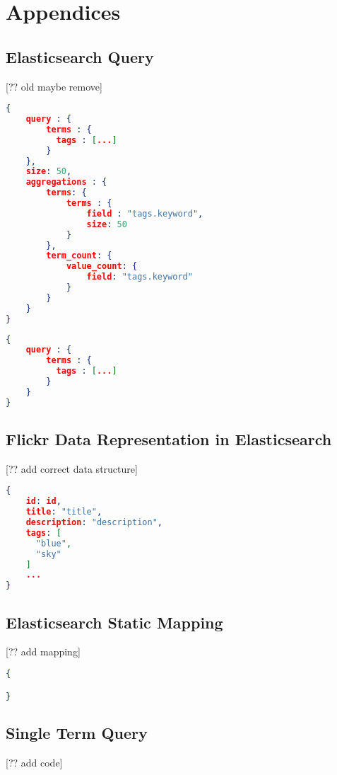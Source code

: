 \chapter{Appendices}

\section{Elasticsearch Query}
[?? old maybe remove]
\begin{lstlisting}[language=json, caption={Initial query to retrive query expansion data}, label={ap:initial-query}]
{
    query : {
        terms : {
          tags : [...]
        }
    },
    size: 50,
    aggregations : {
        terms: {
            terms : {
                field : "tags.keyword",
                size: 50
            }
        },
        term_count: {
            value_count: {
                field: "tags.keyword"
            }
        }
    }
}
\end{lstlisting}

\begin{lstlisting}[language=json, caption={Elasticsearch term search}, label={ap:final-query}]
{
    query : {
        terms : {
          tags : [...]
        }
    }
}
\end{lstlisting}

\section{Flickr Data Representation in Elasticsearch}
[?? add correct data structure]
\begin{lstlisting}[language={json}, caption={Internal photo data representation in elasticsearch}, label={ap:flickr-data}]
{
    id: id,
    title: "title",
    description: "description",
    tags: [
      "blue",
      "sky"
    ]
    ...
}
\end{lstlisting}

\section{Elasticsearch Static Mapping}
[?? add mapping]
\begin{lstlisting}[language={json}, caption={The static Elasticsearch mapping used on the photo index in the experiment setup.}, label={ap:elasticsearch-mapping}]
{

}
\end{lstlisting}

\section{Single Term Query}
[?? add code]
\begin{lstlisting}[language={java}, caption={Java code used to search for a single term.}, label={ap:single-term-query}]

\end{lstlisting}

